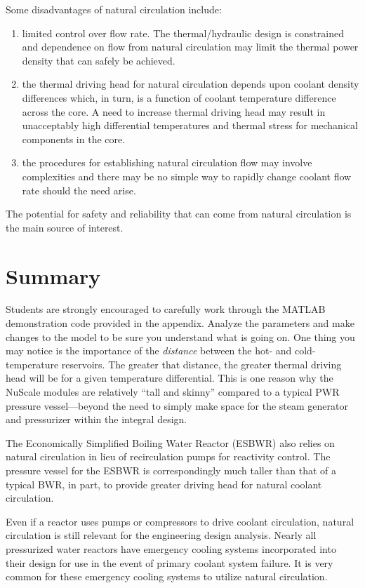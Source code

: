 Some disadvantages of natural circulation include:
\begin{enumerate}
\item limited control over flow rate.  The thermal/hydraulic design is constrained and dependence on flow from natural circulation may limit the thermal power density that can safely be achieved.
\item the thermal driving head for natural circulation depends upon coolant density differences which, in turn, is a function of coolant temperature difference across the core.  A need to increase thermal driving head may result in unacceptably high differential temperatures and thermal stress for mechanical components in the core.
\item the procedures for establishing natural circulation flow may involve complexities and there may be no simple way to rapidly change coolant flow rate should the need arise.
\end{enumerate}

The potential for safety and reliability that can come from natural circulation is the main source of interest.

\section{Summary}
Students are strongly encouraged to carefully work through the MATLAB demonstration code provided in the appendix.  Analyze the parameters and make changes to the model to be sure you understand what is going on.  One thing you may notice is the importance of the \emph{distance} between the hot- and cold-temperature reservoirs.  The greater that distance, the greater thermal driving head will be for a given temperature differential.  This is one reason why the NuScale modules are relatively ``tall and skinny'' compared to a typical PWR pressure vessel---beyond the need to simply make space for the steam generator and pressurizer within the integral design.  

The Economically Simplified Boiling Water Reactor (ESBWR) also relies on natural circulation in lieu of recirculation pumps for reactivity control.\cite{hinds2006next}  The pressure vessel for the ESBWR is correspondingly much taller than that of a typical BWR, in part, to provide greater driving head for natural coolant circulation. 

Even if a reactor uses pumps or compressors to drive coolant circulation, natural circulation is still relevant for the engineering design analysis.  Nearly all pressurized water reactors have emergency cooling systems incorporated into their design for use in the event of primary coolant system failure.  It is very common for these emergency cooling systems to utilize natural circulation.  

